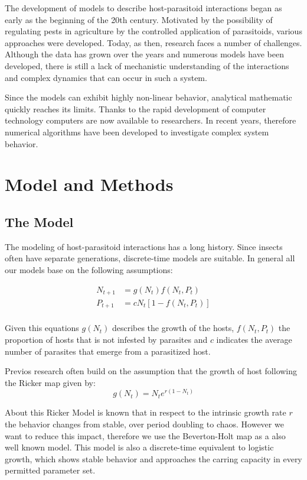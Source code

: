 \documentclass[a4paper,12pt, twoside]{article} %
\begin{document}
The development of models to describe host-parasitoid interactions began as early as the beginning of the 20th century.
Motivated by the possibility of regulating pests in agriculture by the controlled application of 
parasitoids, various approaches were developed. Today, as then, research faces a number of challenges. 
Although the data has grown over the years and numerous models have been developed, there is still a 
lack of mechanistic understanding of the interactions and complex dynamics that can occur in such a system.
 
Since the models can exhibit highly non-linear behavior, analytical mathematic quickly reaches its limits. 
Thanks to the rapid development of computer technology computers are now available to researchers. 
In recent years, therefore numerical algorithms have been developed to investigate complex system behavior.


\section{Model and Methods}

\subsection{The Model}
The modeling of host-parasitoid interactions has a long history. Since insects often have separate generations, 
discrete-time models are suitable. In general all our models base on the following assumptions:

\begin{equation}
\begin{split}
  N_{t+1} &= g(N_t)  f(N_t,P_t) \\
  P_{t+1} &= c N_t[1- f(N_t, P_t)] \\
\end{split}
\end{equation}

Given this equations $g(N_t)$ describes the growth of the hosts, $f(N_t, P_t)$ the proportion of hosts
that is not infested by parasites and $c$ indicates the average number of parasites that emerge from 
a parasitized host.

Previos research often build on the assumption that the growth of host following the Ricker map given
by:
\begin{equation}
  g(N_t)= N_t e^{r(1-N_t)}
\end{equation}

About this Ricker Model is known that in respect to the intrinsic growth rate $r$ the behavior changes 
from stable, over period doubling to chaos.  However we want to reduce this impact, therefore we use 
the Beverton-Holt map as a also well known model. This model is also a discrete-time equivalent to 
logistic growth, which shows stable behavior and approaches the carring capacity in every permitted parameter set. 
\end{document}
